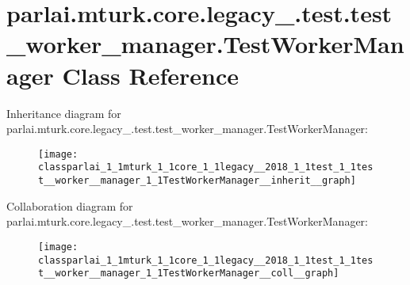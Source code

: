 \hypertarget{classparlai_1_1mturk_1_1core_1_1legacy__2018_1_1test_1_1test__worker__manager_1_1TestWorkerManager}{}\section{parlai.\+mturk.\+core.\+legacy\+\_.\+test.\+test\+\_\+worker\+\_\+manager.\+Test\+Worker\+Manager Class Reference}
\label{classparlai_1_1mturk_1_1core_1_1legacy__2018_1_1test_1_1test__worker__manager_1_1TestWorkerManager}


Inheritance diagram for parlai.\+mturk.\+core.\+legacy\+\_.\+test.\+test\+\_\+worker\+\_\+manager.\+Test\+Worker\+Manager\+:
\nopagebreak
\begin{figure}[H]
\begin{center}
\leavevmode
\texttt{[image: classparlai\_1\_1mturk\_1\_1core\_1\_1legacy\_\_2018\_1\_1test\_1\_1test\_\_worker\_\_manager\_1\_1TestWorkerManager\_\_inherit\_\_graph]}
\end{center}
\end{figure}


Collaboration diagram for parlai.\+mturk.\+core.\+legacy\+\_.\+test.\+test\+\_\+worker\+\_\+manager.\+Test\+Worker\+Manager\+:
\nopagebreak
\begin{figure}[H]
\begin{center}
\leavevmode
\texttt{[image: classparlai\_1\_1mturk\_1\_1core\_1\_1legacy\_\_2018\_1\_1test\_1\_1test\_\_worker\_\_manager\_1\_1TestWorkerManager\_\_coll\_\_graph]}
\end{center}
\end{figure}
